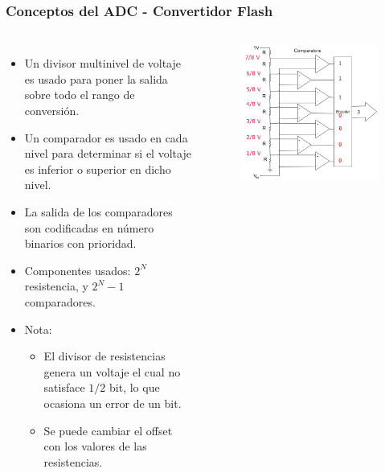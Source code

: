 \documentclass[10.5pt,scale=1.0,t,aspectratio=169,hyperref={pdfpagelabels=false}]{beamer}
\begin{document}
\begin{frame}
	\frametitle{Conceptos del ADC - Convertidor Flash }
	{\small
		\begin{columns}
			\begin{itemize}
				\setlength\itemsep{0cm}
				\item Un divisor multinivel de voltaje es usado para poner la salida sobre todo el rango de conversión.
				\item Un comparador es usado en cada nivel para determinar si el voltaje es inferior o superior en dicho nivel.
				\item La salida de los comparadores son codificadas en número binarios con prioridad. 
				\item Componentes usados: $2^N$ resistencia, y $2^N-1$ comparadores.
				\item Nota:
				\begin{itemize}
					\item El divisor de resistencias genera un voltaje el cual no satisface $1/2$ bit, lo que ocasiona un error de un bit.
					\item Se puede cambiar el offset con los valores de las resistencias. 
				\end{itemize}
			\end{itemize}
			
			\begin{figure}
				\centering\includegraphics[scale=0.45]{fig_FlashComparator}
			\end{figure}
		
		\end{columns}
	}	
\end{frame}
\end{document}
